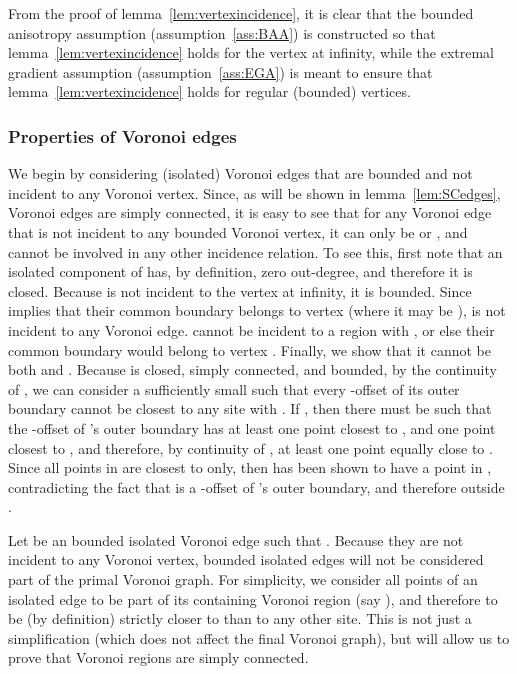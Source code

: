 \documentclass[11pt]{article}
\begin{document}
From the proof of lemma~\ref{lem:vertexincidence}, 
	it is clear that 
	the bounded anisotropy assumption (assumption~\ref{ass:BAA}) 
	is constructed so that lemma~\ref{lem:vertexincidence} holds for the vertex at infinity, 
	while the extremal gradient assumption (assumption~\ref{ass:EGA}) 
	is meant to ensure that  lemma~\ref{lem:vertexincidence} holds for regular (bounded) vertices.




\subsubsection{Properties of Voronoi edges}\label{sec:propedges}



We begin by considering (isolated) Voronoi edges that are bounded and not incident to any Voronoi vertex. 
Since, as will be shown in lemma~\ref{lem:SCedges}, 
	Voronoi edges are simply connected, 
	it is easy to see that for any Voronoi edge 
		that is not incident to any bounded Voronoi vertex,
	it can only be  or , 
	and  cannot be involved in any other incidence relation. 
To see this, first note that an isolated component of  has, 
	by definition, zero out-degree, and therefore it is closed. 
Because  is not incident to the vertex at infinity, it is bounded. 
Since  implies 
	that their common boundary belongs to vertex  (where it may be ), 
	 is not incident to any Voronoi edge. 
 cannot be incident to a region  with , 
	or else their common boundary would belong to vertex . 
Finally, we show that it cannot be 
	both  and . 
Because  is closed, simply connected, and bounded, 
	by the continuity of , 
	we can consider a sufficiently small  
	such that every -offset of its outer boundary cannot be 
	closest to any site  with . 
If , then 
	there must be  
	such that the -offset  of 's outer boundary 
	has at least one point closest to , and one point closest to , 
and therefore, by continuity of , at least one point equally close to . 
Since all points in  are closest to  only, then  has 
	been shown to have a point in , 
	contradicting the fact that  is a -offset of 's outer boundary, 
	and therefore outside . 


Let  be an bounded isolated Voronoi edge 
	such that . 
Because they are not incident to any Voronoi vertex, 
	bounded isolated edges will not be considered part of the primal Voronoi graph.
For simplicity, we consider all points of an isolated edge  to be part of its containing
	Voronoi region (say ), 
	and therefore to be (by definition) strictly closer to  than to any other site. 
This is not just a simplification (which does not affect the final Voronoi graph), 
	but will allow us to prove that Voronoi regions are simply connected. 
	
\end{document}
